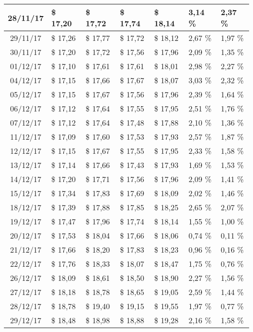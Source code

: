 \begin{center}
\begin{longtable}{|c|p{1.5cm}|p{1.5cm}|p{1.5cm}|p{1.5cm}|p{1.5cm}|p{1.5cm}|}
28/11/17 & \$ 17,20 & \$ 17,72 & \$ 17,74 & \$ 18,14 & 3,14 \% & 2,37 \% \\ \hline
29/11/17 & \$ 17,26 & \$ 17,77 & \$ 17,72 & \$ 18,12 & 2,67 \% & 1,97 \% \\ \hline
30/11/17 & \$ 17,20 & \$ 17,72 & \$ 17,56 & \$ 17,96 & 2,09 \% & 1,35 \% \\ \hline
01/12/17 & \$ 17,10 & \$ 17,61 & \$ 17,61 & \$ 18,01 & 2,98 \% & 2,27 \% \\ \hline
04/12/17 & \$ 17,15 & \$ 17,66 & \$ 17,67 & \$ 18,07 & 3,03 \% & 2,32 \% \\ \hline
05/12/17 & \$ 17,15 & \$ 17,67 & \$ 17,56 & \$ 17,96 & 2,39 \% & 1,64 \% \\ \hline
06/12/17 & \$ 17,12 & \$ 17,64 & \$ 17,55 & \$ 17,95 & 2,51 \% & 1,76 \% \\ \hline
07/12/17 & \$ 17,12 & \$ 17,64 & \$ 17,48 & \$ 17,88 & 2,10 \% & 1,36 \% \\ \hline
11/12/17 & \$ 17,09 & \$ 17,60 & \$ 17,53 & \$ 17,93 & 2,57 \% & 1,87 \% \\ \hline
12/12/17 & \$ 17,15 & \$ 17,67 & \$ 17,55 & \$ 17,95 & 2,33 \% & 1,58 \% \\ \hline
13/12/17 & \$ 17,14 & \$ 17,66 & \$ 17,43 & \$ 17,93 & 1,69 \% & 1,53 \% \\ \hline
14/12/17 & \$ 17,20 & \$ 17,71 & \$ 17,56 & \$ 17,96 & 2,09 \% & 1,41 \% \\ \hline
15/12/17 & \$ 17,34 & \$ 17,83 & \$ 17,69 & \$ 18,09 & 2,02 \% & 1,46 \% \\ \hline
18/12/17 & \$ 17,39 & \$ 17,88 & \$ 17,85 & \$ 18,25 & 2,65 \% & 2,07 \% \\ \hline
19/12/17 & \$ 17,47 & \$ 17,96 & \$ 17,74 & \$ 18,14 & 1,55 \% & 1,00 \% \\ \hline
20/12/17 & \$ 17,53 & \$ 18,04 & \$ 17,66 & \$ 18,06 & 0,74 \% & 0,11 \% \\ \hline
21/12/17 & \$ 17,66 & \$ 18,20 & \$ 17,83 & \$ 18,23 & 0,96 \% & 0,16 \% \\ \hline
22/12/17 & \$ 17,76 & \$ 18,33 & \$ 18,07 & \$ 18,47 & 1,75 \% & 0,76 \% \\ \hline
26/12/17 & \$ 18,09 & \$ 18,61 & \$ 18,50 & \$ 18,90 & 2,27 \% & 1,56 \% \\ \hline
27/12/17 & \$ 18,18 & \$ 18,78 & \$ 18,65 & \$ 19,05 & 2,59 \% & 1,44 \% \\ \hline
28/12/17 & \$ 18,78 & \$ 19,40 & \$ 19,15 & \$ 19,55 & 1,97 \% & 0,77 \% \\ \hline
29/12/17 & \$ 18,48 & \$ 18,98 & \$ 18,88 & \$ 19,28 & 2,16 \% & 1,58 \% \\ \hline

\end{longtable}
\end{center}
